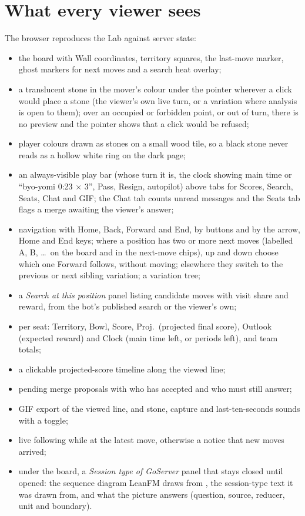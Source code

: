 \documentclass[11pt,oneside]{book}
\begin{document}
\chapter{What every viewer sees}
The browser reproduces the Lab against server state:
\begin{itemize}
  \item the board with Wall coordinates, territory squares, the last-move
  marker, ghost markers for next moves and a search heat overlay;
  \item a translucent stone in the mover's colour under the pointer wherever a
  click would place a stone (the viewer's own live turn, or a variation where
  analysis is open to them); over an occupied or forbidden point, or out of
  turn, there is no preview and the pointer shows that a click would be refused;
  \item player colours drawn as stones on a small wood tile, so a black stone
  never reads as a hollow white ring on the dark page;
  \item an always-visible play bar (whose turn it is, the clock showing main
  time or ``byo-yomi 0:23 \(\times\) 3'', Pass, Resign,
  autopilot) above tabs for Scores, Search, Seats, Chat and GIF; the Chat tab
  counts unread messages and the Seats tab flags a merge awaiting the viewer's
  answer;
  \item navigation with Home, Back, Forward and End, by buttons and by the
  arrow, Home and End keys; where a position has two or more next moves
  (labelled A, B, \ldots\ on the board and in the next-move chips), up and down
  choose which one Forward follows, without moving; elsewhere they switch to the
  previous or next sibling variation; a variation tree;
  \item a \emph{Search at this position} panel listing candidate moves with
  visit share and reward, from the bot's published search or the viewer's own;
  \item per seat: Territory, Bowl, Score, Proj.\ (projected final score),
  Outlook (expected reward) and Clock (main time left, or periods left), and
  team totals;
  \item a clickable projected-score timeline along the viewed line;
  \item pending merge proposals with who has accepted and who must still answer;
  \item GIF export of the viewed line, and stone, capture and last-ten-seconds
  sounds with a toggle;
  \item live following while at the latest move, otherwise a notice that new
  moves arrived;
  \item under the board, a \emph{Session type of GoServer} panel that stays
  closed until opened: the sequence diagram LeanFM draws from
  , the session-type text it was drawn from, and what
  the picture answers (question, source, reducer, unit and boundary).
\end{itemize}
\end{document}
